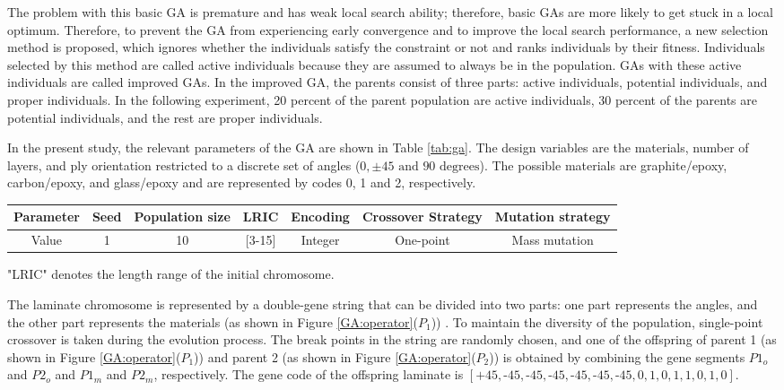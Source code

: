 \documentclass[USenglish]{article}
\begin{document}
The problem with this basic GA is premature and has weak local search ability; therefore, basic GAs are more likely
to get stuck in a local optimum. Therefore, to prevent the GA from experiencing early convergence and to improve the
local search performance, a new selection method is proposed, which ignores whether the
individuals satisfy the constraint or not and ranks individuals by their fitness. Individuals
selected by this method are called active individuals because they are assumed to always be in the
population. GAs with these active individuals are called improved GAs. In the improved GA, the parents
consist of three parts: active individuals, potential individuals, and proper individuals. In the
following experiment, 20 percent of the parent population are active individuals, 30 percent of the
parents are potential individuals, and the rest are proper individuals.

In the present study, the relevant parameters of the GA are shown in Table \ref{tab:ga}. The design
variables are the materials, number of layers, and ply orientation restricted to a discrete set of
angles ($0,\pm 45 \text{ and } 90 \text{ degrees} $). The possible materials are graphite/epoxy,
carbon/epoxy, and glass/epoxy and are represented by codes 0, 1 and 2, respectively.


\begin{adjustbox}{width={\textwidth},totalheight={\textheight},keepaspectratio}
\begin{tabular}{ccccccc}
\toprule
Parameter &  Seed &Population size & LRIC  & Encoding &  Crossover Strategy& Mutation strategy\\
\midrule
Value     & 1     &10               & [3-15]& Integer  &  One-point &Mass mutation   \\
\bottomrule
\end{tabular}
\end{adjustbox}
\label{tab:ga}
\begin{tablenotes}\footnotesize
\item{"LRIC" denotes the length range of the initial chromosome.}
\end{tablenotes}


The laminate chromosome is represented by a double-gene string that can be divided into two parts:
one part represents the angles, and the other part represents the materials (as shown in Figure
\ref{GA:operator}($P_1$)) . To maintain the diversity of the population, single-point crossover is
taken during the evolution process. The break points in the string are randomly chosen, and one of
the offspring of parent 1 (as shown in Figure \ref{GA:operator}($P_1$)) and parent 2 (as shown in
Figure \ref{GA:operator}($P_2$)) is obtained by combining the gene segments $P1_o$ and $P2_o$ and
$P1_m$ and $P2_m$, respectively. The gene code of the offspring laminate is
$[\text{+}45,\text{-}45,\text{-}45,\text{-}45,\text{-}45,\text{-}45,\text{-}45,0,1,0,1,1,0,1,0]$.
\end{document}
